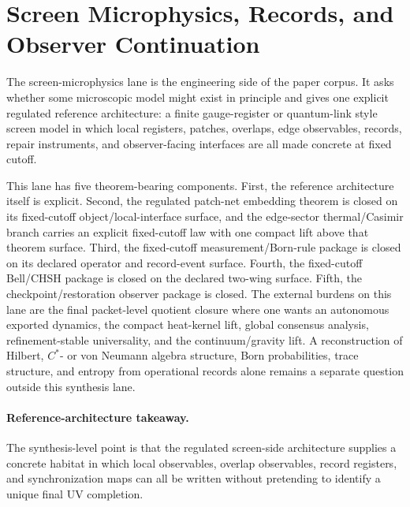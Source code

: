 \section{Screen Microphysics, Records, and Observer Continuation}

The screen-microphysics lane is the engineering side of the paper corpus. It asks
whether some microscopic model might exist in principle and gives one explicit regulated
reference architecture: a finite gauge-register or quantum-link style screen model in which local
registers, patches, overlaps, edge observables, records, repair instruments, and observer-facing
interfaces are all made concrete at fixed cutoff.

This lane has five theorem-bearing components. First, the reference architecture itself is
explicit. Second, the regulated patch-net embedding theorem is closed on its fixed-cutoff
object/local-interface surface, and the edge-sector thermal/Casimir branch carries an explicit
fixed-cutoff law with one compact lift above that theorem surface.
Third, the fixed-cutoff measurement/Born-rule package is closed on its declared operator and
record-event surface. Fourth, the fixed-cutoff
Bell/CHSH package is closed on the declared two-wing surface. Fifth, the
checkpoint/restoration observer package is closed. The external burdens on this lane are the final
packet-level quotient closure where one wants an autonomous exported dynamics, the compact
heat-kernel lift, global consensus analysis, refinement-stable universality, and the
continuum/gravity lift. A reconstruction of Hilbert, \(C^*\)- or von Neumann algebra
structure, Born probabilities, trace structure, and entropy from operational records alone remains
a separate question outside this synthesis lane.

\paragraph{Reference-architecture takeaway.}
The synthesis-level point is that the regulated screen-side architecture supplies a concrete
habitat in which local observables, overlap observables, record registers, and synchronization
maps can all be written without pretending to identify a unique final UV completion.

